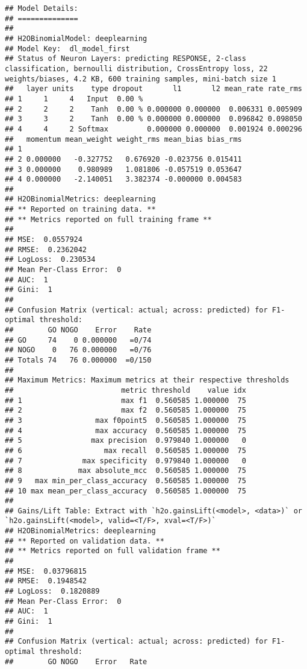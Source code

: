 \documentclass[]{article}
\begin{document}
\begin{verbatim}
## Model Details:
## ==============
## 
## H2OBinomialModel: deeplearning
## Model Key:  dl_model_first 
## Status of Neuron Layers: predicting RESPONSE, 2-class classification, bernoulli distribution, CrossEntropy loss, 22 weights/biases, 4.2 KB, 600 training samples, mini-batch size 1
##   layer units    type dropout       l1       l2 mean_rate rate_rms
## 1     1     4   Input  0.00 %                                     
## 2     2     2    Tanh  0.00 % 0.000000 0.000000  0.006331 0.005909
## 3     3     2    Tanh  0.00 % 0.000000 0.000000  0.096842 0.098050
## 4     4     2 Softmax         0.000000 0.000000  0.001924 0.000296
##   momentum mean_weight weight_rms mean_bias bias_rms
## 1                                                   
## 2 0.000000   -0.327752   0.676920 -0.023756 0.015411
## 3 0.000000    0.980989   1.081806 -0.057519 0.053647
## 4 0.000000   -2.140051   3.382374 -0.000000 0.004583
## 
## H2OBinomialMetrics: deeplearning
## ** Reported on training data. **
## ** Metrics reported on full training frame **
## 
## MSE:  0.0557924
## RMSE:  0.2362042
## LogLoss:  0.230534
## Mean Per-Class Error:  0
## AUC:  1
## Gini:  1
## 
## Confusion Matrix (vertical: actual; across: predicted) for F1-optimal threshold:
##        GO NOGO    Error    Rate
## GO     74    0 0.000000   =0/74
## NOGO    0   76 0.000000   =0/76
## Totals 74   76 0.000000  =0/150
## 
## Maximum Metrics: Maximum metrics at their respective thresholds
##                         metric threshold    value idx
## 1                       max f1  0.560585 1.000000  75
## 2                       max f2  0.560585 1.000000  75
## 3                 max f0point5  0.560585 1.000000  75
## 4                 max accuracy  0.560585 1.000000  75
## 5                max precision  0.979840 1.000000   0
## 6                   max recall  0.560585 1.000000  75
## 7              max specificity  0.979840 1.000000   0
## 8             max absolute_mcc  0.560585 1.000000  75
## 9   max min_per_class_accuracy  0.560585 1.000000  75
## 10 max mean_per_class_accuracy  0.560585 1.000000  75
## 
## Gains/Lift Table: Extract with `h2o.gainsLift(<model>, <data>)` or `h2o.gainsLift(<model>, valid=<T/F>, xval=<T/F>)`
## H2OBinomialMetrics: deeplearning
## ** Reported on validation data. **
## ** Metrics reported on full validation frame **
## 
## MSE:  0.03796815
## RMSE:  0.1948542
## LogLoss:  0.1820889
## Mean Per-Class Error:  0
## AUC:  1
## Gini:  1
## 
## Confusion Matrix (vertical: actual; across: predicted) for F1-optimal threshold:
##        GO NOGO    Error   Rate

\end{verbatim}
\end{document}

